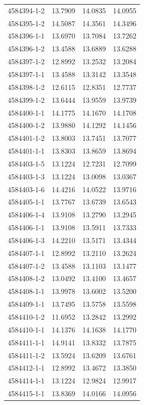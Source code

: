 \begin{longtable}{lrrr}
4584394-1-2 & 13.7909 & 14.0835 & 14.0955 \\
4584395-1-2 & 14.5087 & 14.3561 & 14.3496 \\
4584396-1-1 & 13.6970 & 13.7084 & 13.7262 \\
4584396-1-2 & 13.4588 & 13.6889 & 13.6288 \\
4584397-1-2 & 12.8992 & 13.2532 & 13.2084 \\
4584397-1-1 & 13.4588 & 13.3142 & 13.3548 \\
4584398-1-2 & 12.6115 & 12.8351 & 12.7737 \\
4584399-1-2 & 13.6444 & 13.9559 & 13.9739 \\
4584400-1-1 & 14.1775 & 14.1670 & 14.1708 \\
4584400-1-2 & 13.9880 & 14.1292 & 14.1456 \\
4584401-1-2 & 13.8003 & 13.7451 & 13.7077 \\
4584401-1-1 & 13.8303 & 13.8659 & 13.8694 \\
4584403-1-5 & 13.1224 & 12.7231 & 12.7099 \\
4584403-1-3 & 13.1224 & 13.0098 & 13.0367 \\
4584403-1-6 & 14.4216 & 14.0522 & 13.9716 \\
4584405-1-1 & 13.7767 & 13.6739 & 13.6543 \\
4584406-1-4 & 13.9108 & 13.2790 & 13.2945 \\
4584406-1-1 & 13.9108 & 13.5911 & 13.7333 \\
4584406-1-3 & 14.2210 & 13.5171 & 13.4344 \\
4584407-1-1 & 12.8992 & 13.2110 & 13.2624 \\
4584407-1-2 & 13.4588 & 13.1103 & 13.1477 \\
4584408-1-2 & 13.0492 & 13.4100 & 13.4657 \\
4584408-1-1 & 13.9978 & 13.6002 & 13.5200 \\
4584409-1-1 & 13.7495 & 13.5758 & 13.5598 \\
4584410-1-2 & 11.6952 & 13.2842 & 13.2992 \\
4584410-1-1 & 14.1376 & 14.1638 & 14.1770 \\
4584411-1-1 & 14.9141 & 13.8332 & 13.7875 \\
4584411-1-2 & 13.5924 & 13.6209 & 13.6761 \\
4584412-1-1 & 12.8992 & 13.4672 & 13.3850 \\
4584414-1-1 & 13.1224 & 12.9824 & 12.9917 \\
4584415-1-1 & 13.8369 & 14.0166 & 14.0956 \\

\end{longtable}
